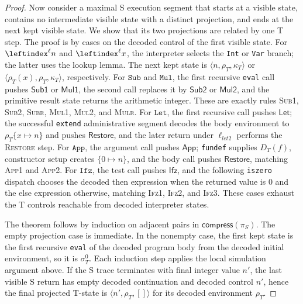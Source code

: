 \documentclass[11pt]{article}
\begin{document}
\begin{proof}
Now consider a maximal S execution segment that starts at a visible state, contains no
intermediate visible state with a distinct projection, and ends at the next kept visible state.
We show that its two projections are related by one T step.  The proof is by cases on the
decoded control of the first visible state.
For \(\leftindex^\ell n\) and \(\leftindex^\ell x\), the interpreter selects the
\texttt{Int} or \texttt{Var} branch; the latter uses the lookup lemma.  The next kept state is
\(\langle n,\rho_T,\kappa_T\rangle\) or
\(\langle \rho_T(x),\rho_T,\kappa_T\rangle\), respectively.
For \(\texttt{Sub}\) and \(\texttt{Mul}\), the first recursive \texttt{eval} call pushes
\(\textsf{Sub1}\) or \(\textsf{Mul1}\), the second call replaces it by
\(\textsf{Sub2}\) or \(\textsf{Mul2}\), and the primitive result state returns the arithmetic
integer.  These are exactly rules \textsc{Sub1}, \textsc{Sub2}, \textsc{Subr},
\textsc{Mul1}, \textsc{Mul2}, and \textsc{Mulr}.
For \(\texttt{Let}\), the first recursive call pushes \(\textsf{Let}\); the successful
\texttt{extend} administrative segment decodes the body environment to \(\rho_T\{x\mapsto n\}\)
and pushes \(\textsf{Restore}\), and the later return under \(\ell_{\textit{let2}}\) performs
the \textsc{Restore} step.
For \(\texttt{App}\), the argument call pushes \(\textsf{App}\); \texttt{fundef} supplies
\(D_T(f)\), constructor setup creates \(\{0\mapsto n\}\), and the body call pushes
\(\textsf{Restore}\), matching \textsc{App1} and \textsc{App2}.
For \(\texttt{Ifz}\), the test call pushes \(\textsf{Ifz}\), and the following
\texttt{iszero} dispatch chooses the decoded then expression when the returned value is \(0\)
and the else expression otherwise, matching \textsc{Ifz1}, \textsc{Ifz2}, and
\textsc{Ifz3}.
These cases exhaust the T controls reachable from decoded interpreter states.

The theorem follows by induction on adjacent pairs in \(\mathsf{compress}(\pi_S)\).
The empty projection case is immediate.  In the nonempty case, the first kept state is the
first recursive \texttt{eval} of the decoded program body from the decoded initial environment,
so it is \(\sigma_T^0\).  Each induction step applies the local simulation argument above.
If the S trace terminates with final integer value \(n'\), the last visible S return has empty
decoded continuation and decoded control \(n'\), hence the final projected T-state is
\(\langle n',\rho_T,[]\rangle\) for its decoded environment \(\rho_T\).
\end{proof}
\end{document}
